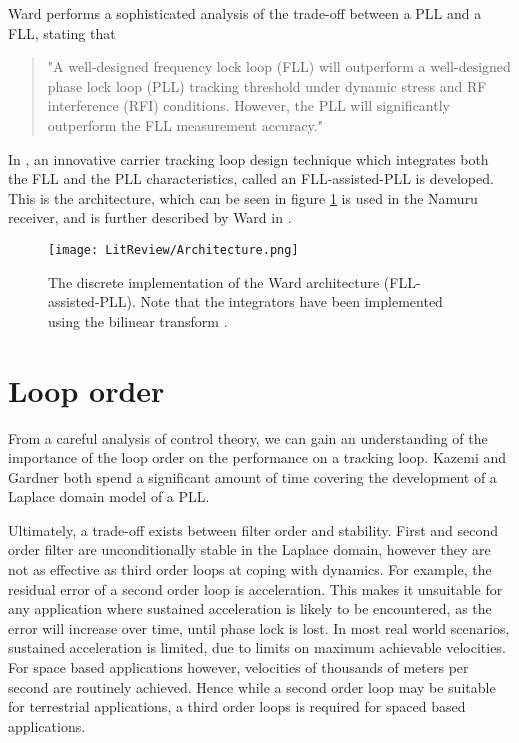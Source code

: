 Ward performs a sophisticated analysis of the trade-off between a \ac{PLL} and a \ac{FLL}, stating that 
\begin{quotation}
"A well-designed frequency lock loop (FLL) will outperform
a well-designed phase lock loop (PLL) tracking threshold
under dynamic stress and RF interference (RFI) conditions.
However, the PLL will significantly outperform the FLL
measurement accuracy."\cite{ward1998}
\end{quotation}

In \cite{ward1998}, an innovative carrier tracking loop design technique which
integrates both the FLL and the PLL characteristics, called an FLL-assisted-PLL is developed. This is the architecture, which can be seen in figure \ref{fig:Architecture} is used in the Namuru receiver, and is further described by Ward in \cite{Kaplan}.

\begin{figure}[!htb] 
    \centering
    \texttt{[image: LitReview/Architecture.png]} 
    \caption{The discrete implementation of the Ward architecture (FLL-assisted-PLL). Note that the integrators have been implemented using the bilinear transform \cite{Ward}.}
    \label{fig:Architecture}
\end{figure}

\section{Loop order}
From a careful analysis of control theory, we can gain an understanding of the importance of the loop order on the performance on a tracking loop. Kazemi \cite{KazemiPHD,Kazemi2008} and Gardner \cite{Gardner} both spend a significant amount of time covering the development of a Laplace domain model of a \ac{PLL}. 

Ultimately, a trade-off exists between filter order and stability. First and second order filter are unconditionally stable in the Laplace domain, however they are not as effective as third order loops at coping with dynamics. For example, the residual error of a second order loop is acceleration. This makes it unsuitable for any application where sustained acceleration is likely to be encountered, as the error will increase over time, until phase lock is lost. In most real world scenarios, sustained acceleration is limited, due to limits on maximum achievable velocities. For space based applications however, velocities of thousands of meters per second are routinely achieved. Hence while a second order loop may be suitable for terrestrial applications, a third order loops is required for spaced based applications. 

